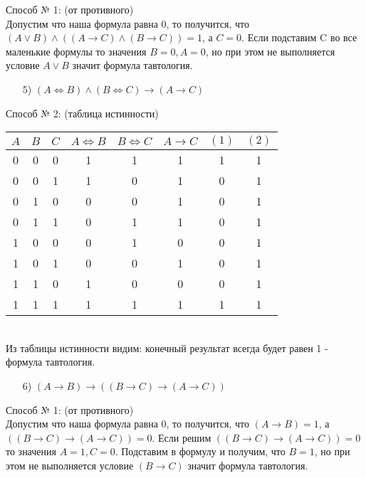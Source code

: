 \documentclass{article}
\begin{document}
Способ № 1: (от противного)\\
Допустим что наша формула равна 0, то получится, что $(A \vee B) \wedge ((A \rightarrow C) \wedge (B \rightarrow C)) = 1$, а $C = 0$. Если подставим C во все маленькие формулы то значения $B = 0, A = 0$, но при этом не выполняется условие $A \vee B$ значит формула тавтология.\\
\begin{enumerate}
\item[5)] $(A \Longleftrightarrow B) \wedge (B \Longleftrightarrow C) \rightarrow (A \rightarrow C)$
\end{enumerate}
Способ № 2: (таблица истинности)\\
\begin{tabular}{ | c | c | c | c | c | c | c| c | } %
$A$ & $B$ & $C$ & $A \Longleftrightarrow B$ & $B \Longleftrightarrow C$ & $A \rightarrow C$ & $(1)$ & $(2)$\\ \hline
0 & 0 & 0 & 1 & 1 & 1 & 1 & 1\\
0 & 0 & 1 & 1 & 0 & 1 & 0 & 1\\
0 & 1 & 0 & 0 & 0 & 1 & 0 & 1\\
0 & 1 & 1 & 0 & 1 & 1 & 0 & 1\\
1 & 0 & 0 & 0 & 1 & 0 & 0 & 1\\
1 & 0 & 1 & 0 & 0 & 1 & 0 & 1\\
1 & 1 & 0 & 1 & 0 & 0 & 0 & 1\\
1 & 1 & 1 & 1 & 1 & 1 & 1 & 1\\
\hline
\end{tabular} \\
Из таблицы истинности видим: конечный результат всегда будет равен 1 - формула тавтология.
\begin{enumerate}
\item[6)] $(A \rightarrow B) \rightarrow ((B \rightarrow C) \rightarrow (A \rightarrow C))$
\end{enumerate}
Способ № 1: (от противного)\\
Допустим что наша формула равна 0, то получится, что $(A \rightarrow B) = 1$, а $((B \rightarrow C) \rightarrow (A \rightarrow C)) = 0$. Если решим $((B \rightarrow C) \rightarrow (A \rightarrow C)) = 0$ то значения $A = 1, C = 0$. Подставим в формулу и получим, что $B = 1$, но при этом не выполняется условие $(B \rightarrow C)$ значит формула тавтология.\\
\end{document}

